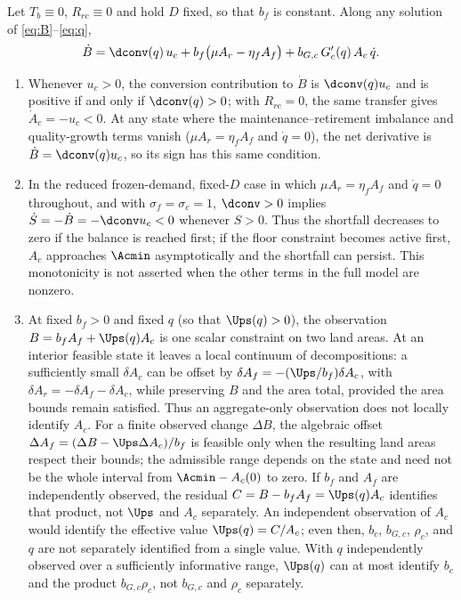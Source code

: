 \begin{proposition}\label{prop:mask}
Let $T_b\equiv0$, $R_{rc}\equiv0$ and hold $D$ fixed, so that $b_f$ is constant. Along any solution of \eqref{eq:B}--\eqref{eq:q},
\begin{equation}\label{eq:identity}
\dot B=\dconv(q)\,u_c+b_f\big(\mu A_r-\eta_f A_f\big)+b_{G,c}\,G_c'(q)\,A_c\,\dot q .
\end{equation}
\begin{enumerate}[label=(\roman*)]
\item Whenever $u_c>0$, the conversion contribution to $\dot B$ is $\dconv(q)u_c$ and is positive if and only if $\dconv(q)>0$; with $R_{rc}=0$, the same transfer gives $\dot A_c=-u_c<0$. At any state where the maintenance--retirement imbalance and quality-growth terms vanish ($\mu A_r=\eta_f A_f$ and $\dot q=0$), the net derivative is $\dot B=\dconv(q)u_c$, so its sign has this same condition.
\item In the reduced frozen-demand, fixed-$D$ case in which $\mu A_r=\eta_f A_f$ and $\dot q=0$ throughout, and with $\sigma_f=\sigma_c=1$, $\dconv>0$ implies $\dot S=-\dot B=-\dconv u_c<0$ whenever $S>0$. Thus the shortfall decreases to zero if the balance is reached first; if the floor constraint becomes active first, $A_c$ approaches $\Acmin$ asymptotically and the shortfall can persist. This monotonicity is not asserted when the other terms in the full model are nonzero.
\item At fixed $b_f>0$ and fixed $q$ (so that $\Ups(q)>0$), the observation $B=b_fA_f+\Ups(q)A_c$ is one scalar constraint on two land areas. At an interior feasible state it leaves a local continuum of decompositions: a sufficiently small $\delta A_c$ can be offset by $\delta A_f=-(\Ups/b_f)\delta A_c$, with $\delta A_r=-\delta A_f-\delta A_c$, while preserving $B$ and the area total, provided the area bounds remain satisfied. Thus an aggregate-only observation does not locally identify $A_c$. For a finite observed change $\Delta B$, the algebraic offset $\Delta A_f=(\Delta B-\Ups\Delta A_c)/b_f$ is feasible only when the resulting land areas respect their bounds; the admissible range depends on the state and need not be the whole interval from $\Acmin-A_c(0)$ to zero. If $b_f$ and $A_f$ are independently observed, the residual $C=B-b_fA_f=\Ups(q)A_c$ identifies that product, not $\Ups$ and $A_c$ separately. An independent observation of $A_c$ would identify the effective value $\Ups(q)=C/A_c$; even then, $b_c$, $b_{G,c}$, $\rho_c$, and $q$ are not separately identified from a single value. With $q$ independently observed over a sufficiently informative range, $\Ups(q)$ can at most identify $b_c$ and the product $b_{G,c}\rho_c$, not $b_{G,c}$ and $\rho_c$ separately.
\end{enumerate}
\end{proposition}

